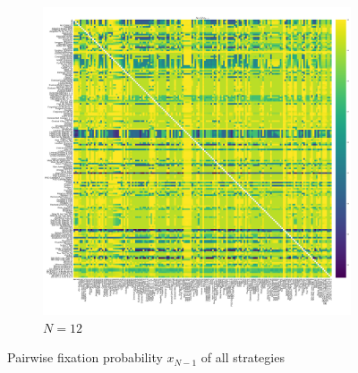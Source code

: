 \documentclass{article}
\begin{document}
\begin{figure}[!hbtp]
    \begin{subfigure}[t]{.3\textwidth}
        \centering
        \includegraphics[width=.8\textwidth]{./img/fixation_heatmap_12_resist.pdf}
        \caption{\(N=12\)}

    \end{subfigure}%

    \caption{Pairwise fixation probability \(x_{N-1}\) of all strategies}
    \label{fig:fixation_heatmap_resist}
\end{figure}
\end{document}
